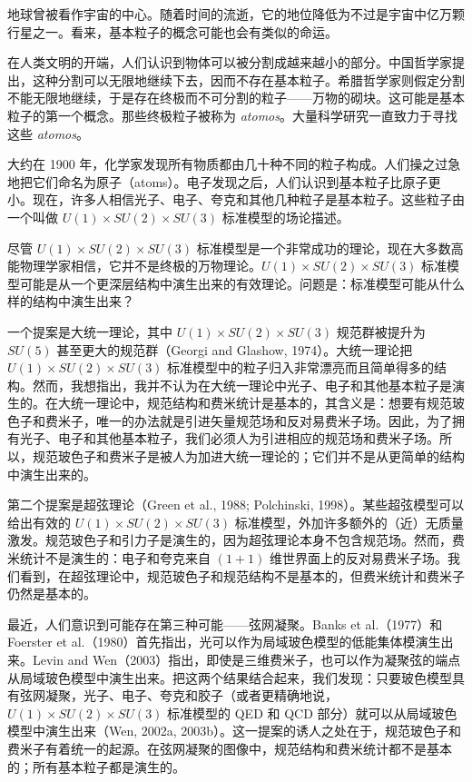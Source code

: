 地球曾被看作宇宙的中心。随着时间的流逝，它的地位降低为不过是宇宙中亿万颗行星之一。看来，基本粒子的概念可能也会有类似的命运。

在人类文明的开端，人们认识到物体可以被分割成越来越小的部分。中国哲学家提出，这种分割可以无限地继续下去，因而不存在基本粒子。希腊哲学家则假定分割不能无限地继续，于是存在终极而不可分割的粒子——万物的砌块。这可能是基本粒子的第一个概念。那些终极粒子被称为 \emph{atomos}。大量科学研究一直致力于寻找这些 \emph{atomos}。

大约在 1900 年，化学家发现所有物质都由几十种不同的粒子构成。人们操之过急地把它们命名为原子（atoms）。电子发现之后，人们认识到基本粒子比原子更小。现在，许多人相信光子、电子、夸克和其他几种粒子是基本粒子。这些粒子由一个叫做 $U(1)\times SU(2)\times SU(3)$ 标准模型的场论描述。

尽管 $U(1)\times SU(2)\times SU(3)$ 标准模型是一个非常成功的理论，现在大多数高能物理学家相信，它并不是终极的万物理论。$U(1)\times SU(2)\times SU(3)$ 标准模型可能是从一个更深层结构中演生出来的有效理论。问题是：标准模型可能从什么样的结构中演生出来？

一个提案是大统一理论，其中 $U(1)\times SU(2)\times SU(3)$ 规范群被提升为 $SU(5)$ 甚至更大的规范群（Georgi and Glashow, 1974）。大统一理论把 $U(1)\times SU(2)\times SU(3)$ 标准模型中的粒子归入非常漂亮而且简单得多的结构。然而，我想指出，我并不认为在大统一理论中光子、电子和其他基本粒子是演生的。在大统一理论中，规范结构和费米统计是基本的，其含义是：想要有规范玻色子和费米子，唯一的办法就是引进矢量规范场和反对易费米子场。因此，为了拥有光子、电子和其他基本粒子，我们必须人为引进相应的规范场和费米子场。所以，规范玻色子和费米子是被人为加进大统一理论的；它们并不是从更简单的结构中演生出来的。

第二个提案是超弦理论（Green et al., 1988; Polchinski, 1998）。某些超弦模型可以给出有效的 $U(1)\times SU(2)\times SU(3)$ 标准模型，外加许多额外的（近）无质量激发。规范玻色子和引力子是演生的，因为超弦理论本身不包含规范场。然而，费米统计不是演生的：电子和夸克来自 $(1+1)$ 维世界面上的反对易费米子场。我们看到，在超弦理论中，规范玻色子和规范结构不是基本的，但费米统计和费米子仍然是基本的。

最近，人们意识到可能存在第三种可能——弦网凝聚。Banks et al.（1977）和 Foerster et al.（1980）首先指出，光可以作为局域玻色模型的低能集体模演生出来。Levin and Wen（2003）指出，即使是三维费米子，也可以作为凝聚弦的端点从局域玻色模型中演生出来。把这两个结果结合起来，我们发现：只要玻色模型具有弦网凝聚，光子、电子、夸克和胶子（或者更精确地说，$U(1)\times SU(2)\times SU(3)$ 标准模型的 QED 和 QCD 部分）就可以从局域玻色模型中演生出来（Wen, 2002a, 2003b）。这一提案的诱人之处在于，规范玻色子和费米子有着统一的起源。在弦网凝聚的图像中，规范结构和费米统计都不是基本的；所有基本粒子都是演生的。

